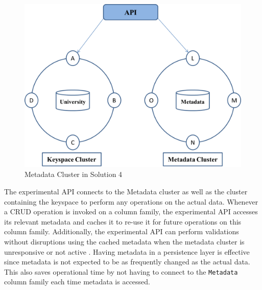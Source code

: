 \begin{figure}[h]
	\centering
	\includegraphics[width=.6\textwidth]{./figure/Solutions/Sol4-cluster-pic.png}
	\caption{Metadata Cluster in Solution
	4}\label{fd:MetadataCluster-Solution4}
	
\end{figure}
 The experimental \ac{API} connects to the Metadata cluster as well as
the cluster containing the keyspace to perform any operations on the actual
data.  Whenever a \ac{CRUD} operation is invoked on a column family,  the
experimental \ac{API} accesses its relevant metadata and caches it to re-use it
for future operations on this column family. 
Additionally,  the experimental \ac{API} can perform validations without
disruptions using the cached metadata when the metadata cluster is unresponsive or not active . 
Having metadata in a persistence layer is effective since metadata is not
expected to be as frequently changed as the actual data.  This also saves
operational time by not having to connect to the
\texttt{Metadata} column family each time  metadata is accessed. 




